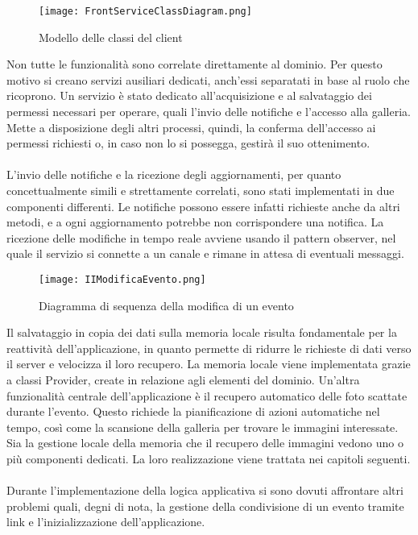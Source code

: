 \clearpage

\begin{figure}[h!]
    \begin{center}
        \texttt{[image: FrontServiceClassDiagram.png]}
        \caption{Modello delle classi del client}
    \end{center}
\end{figure}

Non tutte le funzionalità sono correlate direttamente al dominio.
Per questo motivo si creano servizi ausiliari dedicati,
anch'essi separatati in base al ruolo che ricoprono.
\clearpage
Un servizio è stato dedicato all'acquisizione e
al salvataggio dei permessi necessari per operare,
quali l'invio delle notifiche e l'accesso alla galleria.
Mette a disposizione degli altri processi, quindi, 
la conferma dell'accesso ai permessi richiesti o,
in caso non lo si possegga, gestirà il suo ottenimento.\\
\\
L'invio delle notifiche e la ricezione degli aggiornamenti,
per quanto concettualmente simili e strettamente correlati,
sono stati implementati in due componenti differenti.
Le notifiche possono essere infatti richieste anche da altri metodi,
e a ogni aggiornamento potrebbe non corrispondere una notifica.
La ricezione delle modifiche in tempo reale avviene usando il pattern observer,
nel quale il servizio si connette a un canale e rimane in attesa di eventuali messaggi.\\

\begin{figure}[h!]
    \begin{center}
        \texttt{[image: IIModificaEvento.png]}
        \caption{Diagramma di sequenza della modifica di un evento}
    \end{center}
\end{figure}

\clearpage

Il salvataggio in copia dei dati sulla memoria locale
risulta fondamentale per la reattività dell'applicazione,
in quanto permette di ridurre le richieste di dati verso il server
e velocizza il loro recupero.
La memoria locale viene implementata grazie a classi Provider,
create in relazione agli elementi del dominio.
Un'altra funzionalità centrale dell'applicazione è il recupero automatico
delle foto scattate durante l'evento.
Questo richiede la pianificazione di azioni automatiche nel tempo,
così come la scansione della galleria per trovare le immagini interessate.
Sia la gestione locale della memoria che il recupero delle immagini
vedono uno o più componenti dedicati.
La loro realizzazione viene trattata nei capitoli seguenti.\\
\\
Durante l'implementazione della logica applicativa
si sono dovuti affrontare altri problemi quali, degni di nota,
la gestione della condivisione di un evento tramite link e
l'inizializzazione dell'applicazione.\\

